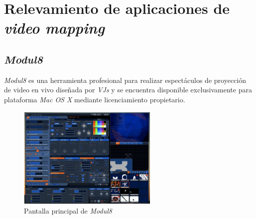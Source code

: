 ﻿\chapter{Relevamiento de aplicaciones de \emph{video mapping}}
\section{\emph{Modul8}}
\emph{Modul8} \cite{Module8} es una herramienta profesional para realizar espectáculos de proyección de video en vivo diseñada por \emph{VJs} y se encuentra disponible exclusivamente para plataforma \emph{Mac OS X} mediante licenciamiento propietario.%

\begin{figure}[H]
  \centering
    \includegraphics[width=0.6\textwidth]{./Cap3_aplicaciones/apps-modul8.png}
  \caption{Pantalla principal de \emph{Modul8}}%
  \label{fig:Apps-Module8}
\end{figure}

